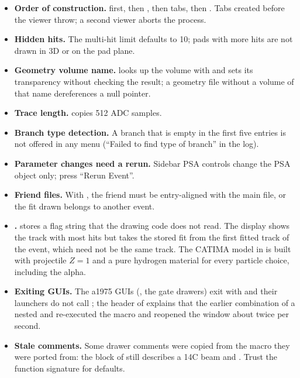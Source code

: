 \begin{itemize}
  \item \textbf{Order of construction.}  first, then ,
        then tabs, then . Tabs created before the viewer throw; a second viewer
        aborts the process.
  \item \textbf{Hidden hits.} The  multi-hit limit defaults to 10; pads with more
        hits are not drawn in 3D or on the pad plane.
  \item \textbf{Geometry volume name.}  looks up the volume
         with  and sets its transparency
        without checking the result; a geometry file without a volume of that name dereferences a null pointer.
  \item \textbf{Trace length.}  copies 512 ADC samples.
  \item \textbf{Branch type detection.} A branch that is empty in the first five entries is not
        offered in any menu (``Failed to find type of branch'' in the log).
  \item \textbf{Parameter changes need a rerun.} Sidebar PSA controls change the PSA object only;
        press ``Rerun Event''.
  \item \textbf{Friend files.} With , the friend must be entry-aligned with the
        main file, or the fit drawn belongs to another event.
  \item \textbf{.}  stores a flag string that the drawing
        code does not read. The display shows the track with most hits but takes the stored fit
        from the first fitted track of the event, which need not be the same track. The CATIMA
        model in  is built with projectile $Z=1$ and a pure hydrogen
        material for every particle choice, including the alpha.
  \item \textbf{Exiting GUIs.} The a1975 GUIs (, the gate drawers) exit with
         and their launchers do not call ; the
        header of  explains that the earlier combination of a nested
         and  re-executed the macro and reopened the window about
        twice per second.
  \item \textbf{Stale comments.} Some drawer comments were copied from the macro they were ported
        from: the  block of  still describes a 14C beam and
        . Trust the function signature for defaults.
\end{itemize}
